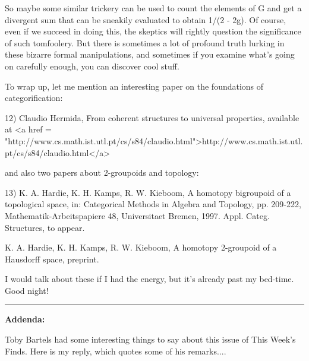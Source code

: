 So maybe some similar trickery can be used to count the elements
of G and get a divergent sum that can be sneakily evaluated to 
obtain 1/(2 - 2g).  Of course, even if we succeed in doing this,
the skeptics will rightly question the significance of such tomfoolery.
But there is sometimes a lot of profound truth lurking in these 
bizarre formal manipulations, and sometimes if you examine what's 
going on carefully enough, you can discover cool stuff.

To wrap up, let me mention an interesting paper on the foundations
of categorification:

12) Claudio Hermida, From coherent structures to universal properties,
available at <a href = "http://www.cs.math.ist.utl.pt/cs/s84/claudio.html">http://www.cs.math.ist.utl.pt/cs/s84/claudio.html</a>

and also two papers about 2-groupoids and topology:

13) K. A. Hardie, K. H. Kamps, R. W. Kieboom, A homotopy bigroupoid of a
topological space, in: Categorical Methods in Algebra and Topology, pp.
209-222, Mathematik-Arbeitspapiere 48, Universitaet Bremen, 1997.   Appl.
Categ. Structures, to appear.

K. A. Hardie, K. H. Kamps, R. W. Kieboom, A homotopy 2-groupoid of a Hausdorff
space, preprint.

I would talk about these if I had the energy, but it's already past
my bed-time.  Good night!


\par\noindent\rule{\textwidth}{0.4pt}

\textbf{Addenda:}

Toby Bartels had some interesting things to say about this issue
of This Week's Finds.  Here is my reply, which quotes some of his
remarks.... 



